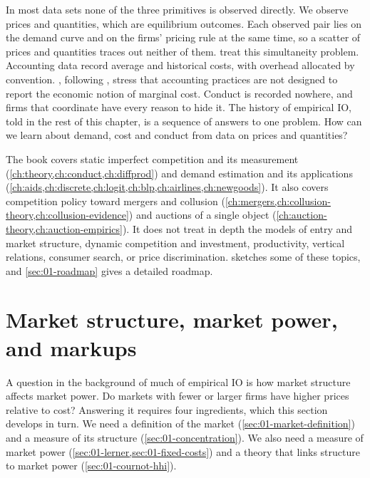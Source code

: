 In most data sets none of the three primitives is observed directly. We observe prices and quantities, which
are equilibrium outcomes. Each observed pair lies on the demand curve and on the firms' pricing rule at the
same time, so a scatter of prices and quantities traces out neither of them.  treat
this simultaneity problem. Accounting data record average and historical costs, with overhead allocated by
convention. \citet[p.~151]{EinavLevin2010}, following \citet{Bresnahan1989}, stress that accounting practices
are not designed to report the economic notion of marginal cost. Conduct is recorded nowhere, and firms that
coordinate have every reason to hide it. The history of empirical IO, told in the rest of this chapter, is a
sequence of answers to one problem. How can we learn about demand, cost and conduct from data on prices and
quantities?

\begin{remark}
The book covers static imperfect competition and its measurement (\cref{ch:theory,ch:conduct,ch:diffprod}) and
demand estimation and its applications (\cref{ch:aids,ch:discrete,ch:logit,ch:blp,ch:airlines,ch:newgoods}). It
also covers competition policy toward mergers and collusion (\cref{ch:mergers,ch:collusion-theory,ch:collusion-evidence})
and auctions of a single object (\cref{ch:auction-theory,ch:auction-empirics}). It does not treat in depth the
models of entry and market structure, dynamic competition and investment, productivity, vertical relations,
consumer search, or price discrimination.  sketches some of these topics, and
\cref{sec:01-roadmap} gives a detailed roadmap.
\end{remark}

\section{Market structure, market power, and markups}\label{sec:01-definitions}

A question in the background of much of empirical IO is how market structure affects market power. Do markets
with fewer or larger firms have higher prices relative to cost? Answering it requires four ingredients, which
this section develops in turn. We need a definition of the market (\cref{sec:01-market-definition}) and a
measure of its structure (\cref{sec:01-concentration}). We also need a measure of market power
(\cref{sec:01-lerner,sec:01-fixed-costs}) and a theory that links structure to market power
(\cref{sec:01-cournot-hhi}).

